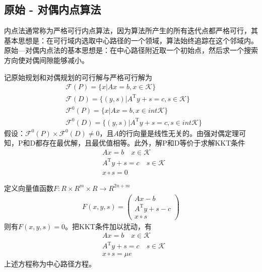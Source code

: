     \subsection{原始 - 对偶内点算法}
        \par
        内点法通常称为严格可行内点算法，因为算法所产生的所有迭代点都严格可行，其基本思想是：在可行域内选取中心路径的一个领域，算法始终追踪在这个邻域内。原始—对偶内点法的基本思想是：在中心路径附近取一个初始点，然后求一个搜索方向使对偶间隙能够减小。
        \par
        记原始规划和对偶规划的可行解与严格可行解为
        \begin{align*}
           & \mathscr{F}(P)=\{x|Ax=b,x \in \mathcal{K}\}\\
           & \mathscr{F}(D)=\{(y,s)|A^\mathrm{T} y+s=c,s \in \mathcal{K}\}\\
           & \mathscr{F}^0(P)=\{x|Ax=b,x \in int{}\mathcal{K}\}\\
           & \mathscr{F}^0(D)=\{(y,s)|A^\mathrm{T} y+s=c,s \in int{}\mathcal{K}\}
        \end{align*}
        假设：$\mathscr{F}^0(P)\times \mathscr{F}^0(D) \neq 0$，且$A$的行向量是线性无关的。由强对偶定理可知，P和D都存在最优解，且最优值相等。此外，解P和D等价于求解KKT条件
        \begin{align*}
           & Ax=b\quad x \in \mathcal{K}\\
           & A^\mathrm{T} y+s=c\quad s \in \mathcal{K}\\
           & x \circ s=0
        \end{align*}
        \par
        定义向量值函数$F:R\times R^m\times R\to R^{2n+m}$
        \begin{align*}
        F(x,y,s) =
        \begin{pmatrix}
        Ax-b\\
        A^\mathrm{T}y + s - c\\
        x\circ s
        \end{pmatrix}
        \end{align*}
        则有$F(x,y,s) = 0 $。把KKT条件加以扰动，有
        \begin{align*}
           & Ax=b\quad x \in \mathcal{K}\\
           & A^\mathrm{T} y+s=c\quad s \in \mathcal{K}\\
           & x \circ s=\mu e
        \end{align*}
        上述方程称为中心路径方程。
        \par
